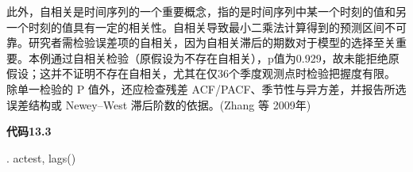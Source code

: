 \documentclass[
  chinese-hans,
  letterpaper,
  DIV=11,
  numbers=noendperiod]{scrreprt}
\newenvironment{Shaded}{\begin{snugshade}}{\end{snugshade}}
\newcommand{\NormalTok}[1]{\textcolor[rgb]{0.00,0.23,0.31}{#1}}
\begin{document}
此外，自相关是时间序列的一个重要概念，指的是时间序列中某一个时刻的值和另一个时刻的值具有一定的相关性。自相关导致最小二乘法计算得到的预测区间不可靠。研究者需检验误差项的自相关，因为自相关滞后的期数对于模型的选择至关重要。本例通过自相关检验（原假设为不存在自相关），p值为0.929，故未能拒绝原假设；这并不证明不存在自相关，尤其在仅36个季度观测点时检验把握度有限。
除单一检验的 P 值外，还应检查残差
ACF/PACF、季节性与异方差，并报告所选误差结构或 Newey--West
滞后阶数的依据。(Zhang 等 2009年)

\begin{tcolorbox}[enhanced jigsaw, arc=.35mm, bottomrule=.15mm, breakable, colback=white, colframe=quarto-callout-note-color-frame, left=2mm, leftrule=.75mm, opacityback=0, rightrule=.15mm, toprule=.15mm]

\vspace{-3mm}\textbf{代码13.3}\vspace{3mm}

\begin{Shaded}
\begin{Highlighting}[]
\NormalTok{. actest, lags()}
\end{Highlighting}
\end{Shaded}

\end{tcolorbox}
\end{document}
